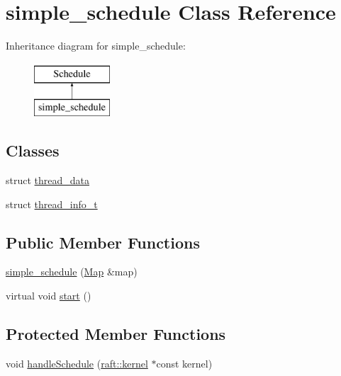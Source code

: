 \hypertarget{classsimple__schedule}{}\section{simple\+\_\+schedule Class Reference}
\label{classsimple__schedule}
Inheritance diagram for simple\+\_\+schedule\+:\begin{figure}[H]
\begin{center}
\leavevmode
\includegraphics[height=2.000000cm]{classsimple__schedule}
\end{center}
\end{figure}
\subsection*{Classes}
\begin{DoxyCompactItemize}
\item 
struct \hyperlink{structsimple__schedule_1_1thread__data}{thread\+\_\+data}
\item 
struct \hyperlink{structsimple__schedule_1_1thread__info__t}{thread\+\_\+info\+\_\+t}
\end{DoxyCompactItemize}
\subsection*{Public Member Functions}
\begin{DoxyCompactItemize}
\item 
\hyperlink{classsimple__schedule_a25bafe4199780c7abda6a9df3a599d88}{simple\+\_\+schedule} (\hyperlink{class_map}{Map} \&map)
\item 
virtual void \hyperlink{classsimple__schedule_ad60a7608111e011d0c04f6ac566cfd8c}{start} ()
\end{DoxyCompactItemize}
\subsection*{Protected Member Functions}
\begin{DoxyCompactItemize}
\item 
void \hyperlink{classsimple__schedule_aafebb0cc13b4539387790ff54ea40830}{handle\+Schedule} (\hyperlink{classraft_1_1kernel}{raft\+::kernel} $\ast$const kernel)
\end{DoxyCompactItemize}
